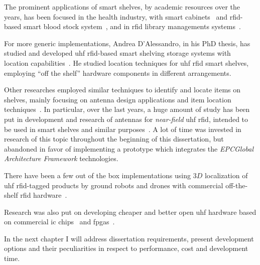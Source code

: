 The prominent applications of smart shelves, by academic resources over the years, has been focused in the health industry, with smart cabinets~\cite{shiehUsingRFIDTechnology2008, dalessandroRFIDBasedSmartShelving2012, medeirosUHFRFIDCabinet2011, gomesIntelligentMedicineCabinet2013} and \ac{rfid}-based smart blood stock system~\cite{zaricRFIDbasedSmartBlood2015}, and in \ac{rfid} library managements systems~\cite{markakisRFIDenabledLibraryManagement2013, markakisSafeEfficientDesign2014, ahmadtarmizibinabdullahLibraryShelfManagement2011, nishiyamaSmartShelfEfficient2012}.

For more generic implementations, Andrea D’Alessandro, in his PhD thesis, has studied and developed \ac{uhf} \ac{rfid}-based smart shelving storage systems with location capabilities~\cite{dalessandroRFIDBasedSmartShelving2012}.
He studied location techniques for \ac{uhf} \ac{rfid} smart shelves, employing ``off the shelf'' hardware components in different arrangements.

Other researches employed similar techniques to identify and locate items on shelves, mainly focusing on antenna design applications and item location techniques~\cite{choiPassiveUHFRFIDBased2012, nikitinTheoryMeasurementBackscattering2007, medeirosUHFRFIDReader, yuanUHFRFIDShelf2012a}. 
In particular, over the last years, a huge amount of study has been put in development and research of antennas for \emph{near-field} \ac{uhf} \ac{rfid}, intended to be used in smart shelves and similar purposes~\cite{yuanUHFRFIDShelf2012a, liCIRCULARLYPOLARIZEDCOMPACT2013, casoModularAntennaUHF2014, ankangrenNovelDesignUHF2010, michelScalableModularAntenna2015, michelOverviewModularAntennas2016, michelDesignPerformanceAnalysis2012, parthibanLowcostScalableUHF2016, andrenkoNovelDesignUHF2013, choPlanarNearFieldRFID2011, tolinPolarizationReconfigurablePatch2019, parthibanScalableNearfieldFed2019, chenDesignSimulationUHF2018, choiUshapedSlotarrayAntenna2011, liUHFRFIDShelf2017, yuanUHFRFIDShelf2012, manziUseTransmissionLines2012, catarinucciImprovingItemlevelTracing2010, guDesignNearFieldRFID2019}.
A lot of time was invested in research of this topic throughout the beginning of this dissertation, but abandoned in favor of implementing a prototype which integrates the \emph{EPCGlobal Architecture Framework} technologies.

There have been a few out of the box implementations using $3D$ localization of \ac{uhf} \ac{rfid}-tagged products by ground robots and drones with commercial off-the-shelf \ac{rfid} hardware~\cite{tzitzisRealtime3DLocalization2020}.

Research was also put on developing cheaper and better open \ac{uhf} hardware based on commercial \ac{ic} chips~\cite{tangDesignUHFRFID2010a, leiDesignHandheldUHF2011, wangHardwareDesignImplementation2015} and \acp{fpga}~\cite{mirandaSistemasRFIDUHF2015}.

In the next chapter I will address dissertation requirements, present development options and their peculiarities in respect to performance, cost and development time.

\cleardoublepage